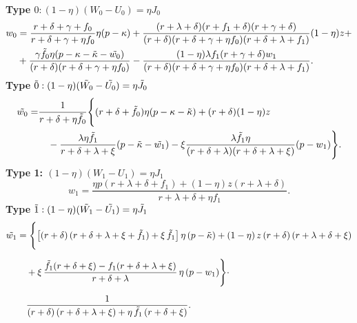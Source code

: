\documentclass[12pt]{article} %
\theoremstyle{definition}
\begin{document}
\noindent \textbf{Type $0: (1-\eta)(W_0-U_0) = \eta J_0$}
\begin{equation}\label{eq WC0 regain}
 \begin{split}
         w_0 & = \frac{r+\delta+\gamma +f_0}{r+\delta+\gamma+\eta f_0}\eta (p-\kappa) + \frac{(r+\lambda+\delta)(r+f_1+\delta)(r+\gamma+\delta)}{(r+\delta)(r+\delta+\gamma + \eta f_0)(r+\delta+\lambda+f_1)} (1-\eta) z + \\  
 & + \frac{\gamma \Tilde{f_0}\eta(p-\kappa-\Tilde{\kappa}-\Tilde{w_0})}{(r+\delta)(r+\delta+\gamma + \eta f_0)} - \frac{(1-\eta)\lambda f_1 (r+\gamma+\delta)w_1}{(r+\delta)(r+\delta+\gamma + \eta f_0)(r+\delta+\lambda+f_1)}. 
    \end{split}
\end{equation}
\textbf{Type $\Tilde{0}: (1-\eta)(\Tilde{W_0}-\Tilde{U_0}) = \eta \Tilde{J_0}$}
\begin{equation}
\begin{aligned}
    \Tilde{w_0} = 
    &\frac{1}{r+\delta+\eta \Tilde{f_0}}\Biggl\{ 
        (r+\delta+\Tilde{f_0})\eta(p-\kappa-\Tilde{\kappa}) + (r+\delta)(1-\eta)z \\
    &\quad - \frac{\lambda \eta \Tilde{f_1}}{r+\delta+\lambda+\xi} (p-\Tilde{\kappa}-\Tilde{w_1}) - \xi \frac{\lambda \Tilde{f_1} \eta}{(r+\delta+\lambda)(r+\delta+\lambda+\xi)} (p-w_1)
      \Biggr\}.\label{eq WC0 tilde regain}
\end{aligned}
\end{equation}
\textbf{Type 1: $(1-\eta)(W_1-U_1) = \eta J_1$}
\begin{equation}
 w_1 = \frac{\eta p (r+\lambda+\delta+f_1)+(1-\eta)z(r+\lambda+\delta)}{r+\lambda+\delta + \eta f_1}. \label{eq WC 1 regain}
 \end{equation}
 \textbf{Type $\Tilde{1}: (1-\eta)(\Tilde{W_1}-\Tilde{U_1}) = \eta \Tilde{J_1}$}
\begin{align}
\Tilde{w_1} 
&= \Biggl\{ 
    \bigl[(r+\delta)\,(r+\delta+\lambda+\xi+\Tilde{f_1}) + \xi\,\Tilde{f_1}\bigr]\,\eta\,(p-\Tilde{\kappa})
    + (1-\eta)\,z\,(r+\delta)\,(r+\lambda+\delta+\xi)
\nonumber \\[6pt]
&\quad + \xi \,\frac{\Tilde{f_1}(r + \delta + \xi) - f_1(r + \delta + \lambda + \xi)}{r + \delta + \lambda}
         \,\eta\,(p - w_1) \Biggr\}\cdot
\label{eq WC1 tilde regain} \\[6pt]
&\quad \frac{1}{
  (r + \delta)\,(r + \delta + \lambda + \xi)
  + \eta\,\Tilde{f_1}\,(r + \delta + \xi)
}.
\nonumber
\end{align}
\end{document}
